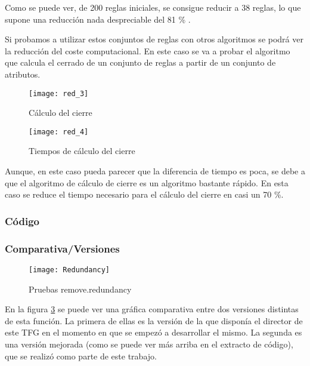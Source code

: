 Como se puede ver, de 200 reglas iniciales, se consigue reducir a 38 reglas, lo que supone una reducci\'on nada despreciable del 81 \% .

Si probamos a utilizar estos conjuntos de reglas con otros algoritmos se podr\'a ver la reducci\'on del coste computacional. En este caso se va a probar el algoritmo que calcula el cerrado de un conjunto de reglas a partir de un conjunto de atributos.

\begin{figure}[H]
    \centering
    \texttt{[image: red\_3]}
    \caption{C\'alculo del cierre}
    \label{fig:red_3}
\end{figure}

\begin{figure}[H]
    \centering
    \texttt{[image: red\_4]}
    \caption{Tiempos de c\'alculo del cierre}
    \label{fig:red_4}
\end{figure}

Aunque, en este caso pueda parecer que la diferencia de tiempo es poca, se debe a que el algoritmo de c\'alculo de cierre es un algoritmo bastante r\'apido. En esta caso se reduce el tiempo necesario para el c\'alculo del cierre en casi un 70 \%.

\newpage
\subsubsection{C\'odigo} 

\newpage
 
\subsubsection{Comparativa/Versiones} 
\begin{figure}[h]
    \centering
    \texttt{[image: Redundancy]}
    \caption{Pruebas remove.redundancy}
    \label{fig:redundancy}
\end{figure} 

En la figura \ref{fig:redundancy} se puede ver una gr\'afica comparativa entre dos versiones distintas de esta funci\'on. La primera de ellas es la versi\'on de la que dispon\'ia el director de este TFG en el momento en que se empez\'o a desarrollar el mismo. La segunda es una versi\'on mejorada (como se puede ver m\'as arriba en el extracto de c\'odigo), que se realiz\'o como parte de este trabajo.
